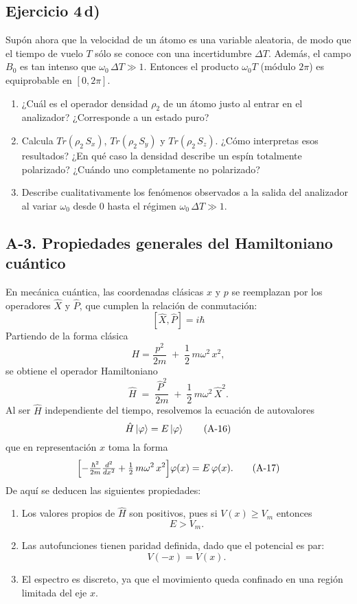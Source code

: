 \documentclass[a4paper,11pt]{article}
\begin{document}
\subsection*{Ejercicio 4\,d)}
Supón ahora que la velocidad de un átomo es una variable aleatoria, de modo que el tiempo de vuelo $T$ sólo se conoce con una incertidumbre $\Delta T$. Además, el campo $B_0$ es tan intenso que $\omega_0\,\Delta T \gg 1$. Entonces el producto $\omega_0 T$ (módulo $2\pi$) es equiprobable en $[0,2\pi]$.
\begin{enumerate}
  \item ¿Cuál es el operador densidad $\rho_2$ de un átomo justo al entrar en el analizador? ¿Corresponde a un estado puro?
  \item Calcula $Tr(\rho_2\,S_x)$, $Tr(\rho_2\,S_y)$ y $Tr(\rho_2\,S_z)$. ¿Cómo interpretas esos resultados? ¿En qué caso la densidad describe un espín totalmente polarizado? ¿Cuándo uno completamente no polarizado?
  \item Describe cualitativamente los fenómenos observados a la salida del analizador al variar $\omega_0$ desde $0$ hasta el régimen $\omega_0\,\Delta T\gg1$.
\end{enumerate}

\subsection*{A-3. Propiedades generales del Hamiltoniano cuántico}

En mecánica cuántica, las coordenadas clásicas \(x\) y \(p\) se reemplazan por los operadores \(\hat X\) y \(\hat P\), que cumplen la relación de conmutación:
\[
[\hat X,\hat P]=i\hbar
\tag{A-14}
\]
Partiendo de la forma clásica
\[
H=\frac{p^2}{2m} \;+\;\frac12\,m\omega^2\,x^2,
\]
se obtiene el operador Hamiltoniano
\[
\hat H \;=\; \frac{\hat P^2}{2m} \;+\;\frac12\,m\omega^2\,\hat X^2.
\tag{A-15}
\]
Al ser \(\hat H\) independiente del tiempo, resolvemos la ecuación de autovalores
\[
\hat H\ket{\varphi}=E\ket{\varphi}
\tag{A-16}
\]
que en representación \(x\) toma la forma
\[
\Bigl[-\tfrac{\hbar^2}{2m}\tfrac{d^2}{dx^2} + \tfrac12\,m\omega^2\,x^2\Bigr]\varphi(x)
= E\,\varphi(x).
\tag{A-17}
\]
De aquí se deducen las siguientes propiedades:
\begin{enumerate}
  \item Los valores propios de \(\hat H\) son positivos, pues si \(V(x)\ge V_m\) entonces
  \[
    E>V_m.
    \tag{A-18}
  \]
  \item Las autofunciones tienen paridad definida, dado que el potencial es par:
  \[
    V(-x)=V(x).
    \tag{A-19}
  \]
  \item El espectro es discreto, ya que el movimiento queda confinado en una región limitada del eje \(x\).
\end{enumerate}
\end{document}
